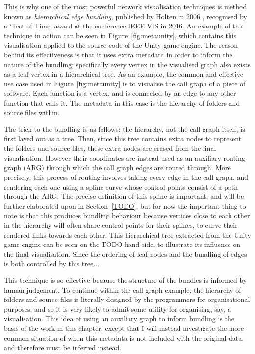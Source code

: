 This is why one of the most powerful network visualisation techniques is method known as \emph{hierarchical edge bundling}, published by Holten in 2006 \cite{Holten2006}, recognised by a `Test of Time' award at the conference IEEE VIS in 2016.
An example of this technique in action can be seen in Figure~\ref{fig:metaunity}, which contains this visualisation applied to the source code of the Unity game engine.
The reason behind its effectiveness is that it uses extra metadata in order to inform the nature of the bundling; specifically every vertex in the visualised graph also exists as a leaf vertex in a hierarchical tree. As an example, the common and effective use case used in Figure~\ref{fig:metaunity} is to visualise the call graph of a piece of software. Each function is a vertex, and is connected by an edge to any other function that calls it. The metadata in this case is the hierarchy of folders and source files within.

The trick to the bundling is as follows: the hierarchy, not the call graph itself, is first layed out as a tree. Then, since this tree contains extra nodes to represent the folders and source files, these extra nodes are erased from the final visualisation. However their coordinates are instead used as an auxiliary routing graph (ARG) through which the call graph edges are routed through.
More precisely, this process of routing involves taking every edge in the call graph, and rendering each one using a spline curve whose control points consist of a path through the ARG. The precise definition of this spline is important, and will be further elaborated upon in Section~\ref{TODO}, but for now the important thing to note is that this produces bundling behaviour because vertices close to each other in the hierarchy will often share control points for their splines, to curve their rendered links towards each other.
This hierarchical tree extracted from the Unity game engine can be seen on the TODO hand side, to illustrate its influence on the final visualisation. Since the ordering of leaf nodes and the bundling of edges is both controlled by this tree...

This technique is so effective because the structure of the bundles is informed by human judgement. To continue within the call graph example, the hierarchy of folders and source files is literally designed by the programmers for organisational purposes, and so it is very likely to admit some utility for organising, say, a visualisation.
This idea of using an auxiliary graph to inform bundling is the basis of the work in this chapter, except that I will instead investigate the more common situation of when this metadata is not included with the original data, and therefore must be inferred instead.

